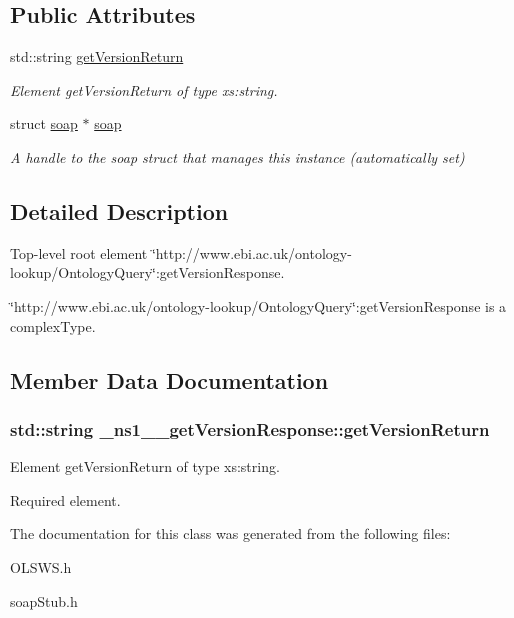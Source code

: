 \subsection*{Public Attributes}
\begin{DoxyCompactItemize}
\item 
std::string \hyperlink{class__ns1____getVersionResponse_a8bb7a3d49ab3669dd728a24a2b6fafdf}{getVersionReturn}
\begin{DoxyCompactList}\small\item\em Element getVersionReturn of type xs:string. \end{DoxyCompactList}\item 
\hypertarget{class__ns1____getVersionResponse_a1352223faf1ef554d7e8a195022e0051}{
struct \hyperlink{class__ns1____getVersionResponse_a1352223faf1ef554d7e8a195022e0051}{soap} $\ast$ \hyperlink{class__ns1____getVersionResponse_a1352223faf1ef554d7e8a195022e0051}{soap}}
\label{class__ns1____getVersionResponse_a1352223faf1ef554d7e8a195022e0051}

\begin{DoxyCompactList}\small\item\em A handle to the soap struct that manages this instance (automatically set) \end{DoxyCompactList}\end{DoxyCompactItemize}


\subsection{Detailed Description}
Top-\/level root element \char`\"{}http://www.ebi.ac.uk/ontology-\/lookup/OntologyQuery\char`\"{}:getVersionResponse. 

\char`\"{}http://www.ebi.ac.uk/ontology-\/lookup/OntologyQuery\char`\"{}:getVersionResponse is a complexType. 

\subsection{Member Data Documentation}
\hypertarget{class__ns1____getVersionResponse_a8bb7a3d49ab3669dd728a24a2b6fafdf}{
\subsubsection[{getVersionReturn}]{\setlength{\rightskip}{0pt plus 5cm}std::string {\bf \_\-ns1\_\-\_\-getVersionResponse::getVersionReturn}}}
\label{class__ns1____getVersionResponse_a8bb7a3d49ab3669dd728a24a2b6fafdf}


Element getVersionReturn of type xs:string. 

Required element. 

The documentation for this class was generated from the following files:\begin{DoxyCompactItemize}
\item 
OLSWS.h\item 
soapStub.h\end{DoxyCompactItemize}
